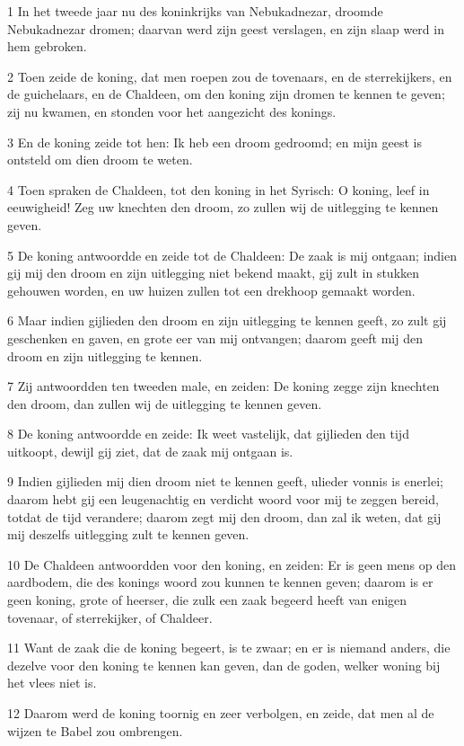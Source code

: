 \par 1 In het tweede jaar nu des koninkrijks van Nebukadnezar, droomde Nebukadnezar dromen; daarvan werd zijn geest verslagen, en zijn slaap werd in hem gebroken.
\par 2 Toen zeide de koning, dat men roepen zou de tovenaars, en de sterrekijkers, en de guichelaars, en de Chaldeen, om den koning zijn dromen te kennen te geven; zij nu kwamen, en stonden voor het aangezicht des konings.
\par 3 En de koning zeide tot hen: Ik heb een droom gedroomd; en mijn geest is ontsteld om dien droom te weten.
\par 4 Toen spraken de Chaldeen, tot den koning in het Syrisch: O koning, leef in eeuwigheid! Zeg uw knechten den droom, zo zullen wij de uitlegging te kennen geven.
\par 5 De koning antwoordde en zeide tot de Chaldeen: De zaak is mij ontgaan; indien gij mij den droom en zijn uitlegging niet bekend maakt, gij zult in stukken gehouwen worden, en uw huizen zullen tot een drekhoop gemaakt worden.
\par 6 Maar indien gijlieden den droom en zijn uitlegging te kennen geeft, zo zult gij geschenken en gaven, en grote eer van mij ontvangen; daarom geeft mij den droom en zijn uitlegging te kennen.
\par 7 Zij antwoordden ten tweeden male, en zeiden: De koning zegge zijn knechten den droom, dan zullen wij de uitlegging te kennen geven.
\par 8 De koning antwoordde en zeide: Ik weet vastelijk, dat gijlieden den tijd uitkoopt, dewijl gij ziet, dat de zaak mij ontgaan is.
\par 9 Indien gijlieden mij dien droom niet te kennen geeft, ulieder vonnis is enerlei; daarom hebt gij een leugenachtig en verdicht woord voor mij te zeggen bereid, totdat de tijd verandere; daarom zegt mij den droom, dan zal ik weten, dat gij mij deszelfs uitlegging zult te kennen geven.
\par 10 De Chaldeen antwoordden voor den koning, en zeiden: Er is geen mens op den aardbodem, die des konings woord zou kunnen te kennen geven; daarom is er geen koning, grote of heerser, die zulk een zaak begeerd heeft van enigen tovenaar, of sterrekijker, of Chaldeer.
\par 11 Want de zaak die de koning begeert, is te zwaar; en er is niemand anders, die dezelve voor den koning te kennen kan geven, dan de goden, welker woning bij het vlees niet is.
\par 12 Daarom werd de koning toornig en zeer verbolgen, en zeide, dat men al de wijzen te Babel zou ombrengen.
